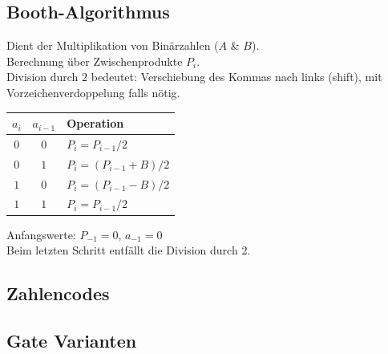\subsection{Booth-Algorithmus}
Dient der Multiplikation von Binärzahlen ($A$ \& $B$).\\
Berechnung über Zwischenprodukte $P_i$.\\
Division durch 2 bedeutet: Verschiebung des Kommas nach links (shift), mit Vorzeichenverdoppelung falls nötig.
\begin{center}
    \begin{tabular}{c c l}
        $a_i$ & $a_{i - 1}$ & Operation\\
        \hline
        $0$ & $0$ & $P_i = P_{i-1}/2$\\
        $0$ & $1$ & $P_i = (P_{i-1} + B)/2$\\
        $1$ & $0$ & $P_i = (P_{i-1} - B)/2$\\
        $1$ & $1$ & $P_i = P_{i-1}/2$\\
    \end{tabular}
\end{center}
Anfangswerte: $P_{-1} = 0$, $a_{-1} = 0$\\
Beim letzten Schritt entfällt die Division durch 2.

\subsection{Zahlencodes}
\begin{center}
\end{center}

\subsection{Gate Varianten}
\begin{center}
\end{center}

